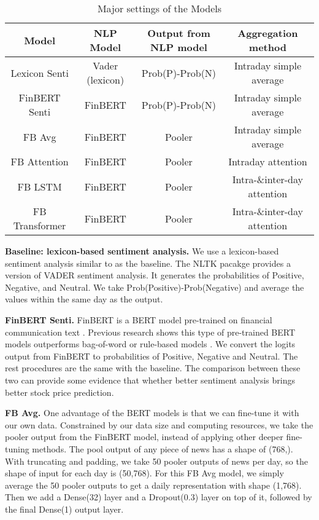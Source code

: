 \documentclass[11pt]{article}
\begin{document}
\begin{table*}[t]
  \centering
  \begin{tabular}{|c|c|c|c|}
  \hline
  Model & NLP Model & Output from NLP model & Aggregation method \\
  \hline
  Lexicon Senti & Vader (lexicon) & Prob(P)-Prob(N) & Intraday simple average \\
  FinBERT Senti & FinBERT & Prob(P)-Prob(N) & Intraday simple average \\
  FB Avg & FinBERT & Pooler & Intraday simple average \\
  FB Attention & FinBERT & Pooler & Intraday attention\\
  FB LSTM & FinBERT & Pooler &  Intra-\&inter-day attention\\
  FB Transformer & FinBERT & Pooler &  Intra-\&inter-day attention\\
  \hline
  \end{tabular}
  \caption{Major settings of the Models}
  \label{tab:experiment_details}
\end{table*}

\textbf{Baseline: lexicon-based sentiment analysis.} We use a lexicon-based sentiment analysis similar to \citet{hao2021} as the baseline. The NLTK pacakge provides a version of VADER \citep{Hutto_Gilbert_2014} sentiment analysis. It generates the probabilities of Positive, Negative, and Neutral. We take Prob(Positive)-Prob(Negative) and average the values within the same day as the output.

\textbf{FinBERT Senti.} FinBERT is a BERT model pre-trained on financial communication text \citep{yang2020finbert}. Previous research shows this type of pre-trained BERT models outperforms bag-of-word or rule-based models \citep{yang2020finbert,ijcai2020p622,araci2019finbert}. We convert the logits output from FinBERT to probabilities of Positive, Negative and Neutral. The rest procedures are the same with the baseline. The comparison between these two can provide some evidence that whether better sentiment analysis brings better stock price prediction. 

\textbf{FB Avg.} One advantage of the BERT models is that we can fine-tune it with our own data. Constrained by our data size and computing resources, we take the pooler output from the FinBERT model, instead of applying other deeper fine-tuning methods. The pool output of any piece of news has a shape of (768,). With truncating and padding, we take 50 pooler outputs of news per day, so the shape of input for each day is (50,768). For this FB Avg model, we simply average the 50 pooler outputs to get a daily representation with shape (1,768). Then we add a Dense(32) layer and a Dropout(0.3) layer on top of it, followed by the final Dense(1) output layer.   
\end{document}
